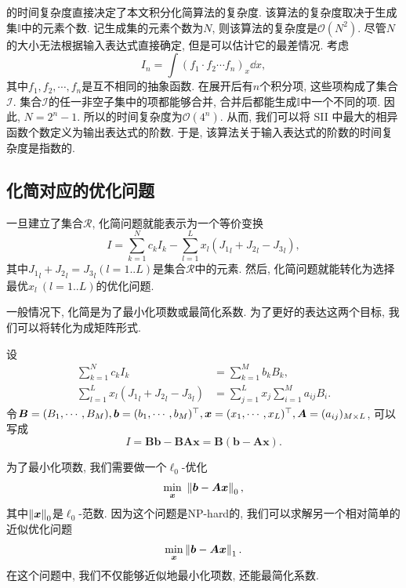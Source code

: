 的时间复杂度直接决定了本文积分化简算法的复杂度. 该算法的复杂度取决于生成集$\mathbb I$中的元素个数. 记生成集的元素个数为$N$, 则该算法的复杂度是$\mathcal O(N^2)$. 尽管$N$的大小无法根据输入表达式直接确定, 但是可以估计它的最差情况. 考虑
\begin{equation}
I_n=\int\!{(f_1\cdot f_2\cdots f_n)_x \dd x},
\label{worst_case}
\end{equation}
其中$f_1,f_2,\cdots,f_n$是互不相同的抽象函数. 在展开后有$n$个积分项, 这些项构成了集合$\mathcal I$. 集合$\mathcal I$的任一非空子集中的项都能够合并, 合并后都能生成$\mathbb I$中一个不同的项. 因此, $N=2^n-1$. 所以的时间复杂度为$\mathcal O(4^n)$. 从而, 我们可以将 SII 中最大的相异函数个数定义为输出表达式的阶数. 于是, 该算法关于输入表达式的阶数的时间复杂度是指数的. 

\subsection{化简对应的优化问题}\label{optimization-03}
一旦建立了集合$\mathcal R$, 化简问题就能表示为一个等价变换
\begin{equation}
I=\sum_{k=1}^N{c_k I_k}-\sum_{l=1}^L{x_l ({J_1}_l+{J_2}_l-{J_3}_l)},
\label{normal_simplify}
\end{equation}
其中${J_1}_l+{J_2}_l={J_3}_l(l=1..L)$是集合$\mathcal R$中的元素. 然后, 化简问题就能转化为选择最优$x_l~(l=1..L)$的优化问题.

一般情况下, 化简是为了最小化项数或最简化系数. 为了更好的表达这两个目标, 我们可以将转化为成矩阵形式. 

设 
\begin{equation}
\begin{split}
\sum_{k=1}^N{c_k I_k} &= \sum_{k=1}^M{b_k B_k},\\
\sum_{l=1}^L{x_l ({J_1}_l+{J_2}_l-{J_3}_l)} &= \sum_{j=1}^L{x_j \sum_{i=1}^M{a_{ij} B_i}}.
\end{split}
\end{equation} 
令$\bm B=(B_1,\cdots,B_M),\bm b=(b_1,\cdots,b_M)^\top,\bm x=(x_1,\cdots,x_L)^\top,\bm A=(a_{ij})_{M \times L}$, 可以写成 
\begin{equation}
I=\bm{B}\bm{b}-\bm{B}\bm{A}\bm{x}=\bm{B}(\bm{b}-\bm{A}\bm{x}).
\end{equation}

为了最小化项数, 我们需要做一个$\ell_0$-优化
\begin{equation}
    \underset{\bm x}\min~\left\Vert\bm{b}-\bm{A}\bm{x}\right\Vert_0,
\end{equation}
其中$\left\Vert\bm x\right\Vert_0$是$\ell_0$-范数. 因为这个问题是NP-hard的, 我们可以求解另一个相对简单的近似优化问题
\begin{equation}
\underset{\bm x}\min\left\Vert\bm{b}-\bm{A}\bm{x}\right\Vert_1.
\label{LAE}
\end{equation}
在这个问题中, 我们不仅能够近似地最小化项数, 还能最简化系数. 

